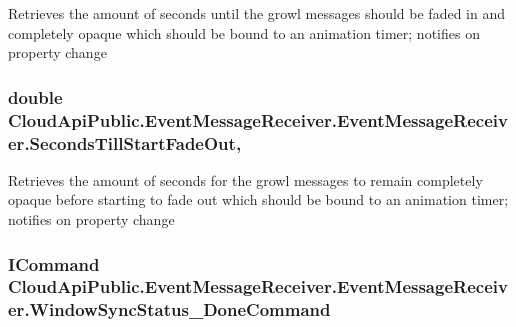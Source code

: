 Retrieves the amount of seconds until the growl messages should be faded in and completely opaque which should be bound to an animation timer; notifies on property change 

\hypertarget{class_cloud_api_public_1_1_event_message_receiver_1_1_event_message_receiver_a74a4bdd5d41cae17fa41ae47900697af}{
\subsubsection[{Seconds\-Till\-Start\-Fade\-Out}]{\setlength{\rightskip}{0pt plus 5cm}double Cloud\-Api\-Public.\-Event\-Message\-Receiver.\-Event\-Message\-Receiver.\-Seconds\-Till\-Start\-Fade\-Out\hspace{0.3cm}{\ttfamily [get]}, {\ttfamily [set]}}}\label{class_cloud_api_public_1_1_event_message_receiver_1_1_event_message_receiver_a74a4bdd5d41cae17fa41ae47900697af}


Retrieves the amount of seconds for the growl messages to remain completely opaque before starting to fade out which should be bound to an animation timer; notifies on property change 

\hypertarget{class_cloud_api_public_1_1_event_message_receiver_1_1_event_message_receiver_a464b93353f7142bb7290f357b059c511}{
\subsubsection[{Window\-Sync\-Status\-\_\-\-Done\-Command}]{\setlength{\rightskip}{0pt plus 5cm}I\-Command Cloud\-Api\-Public.\-Event\-Message\-Receiver.\-Event\-Message\-Receiver.\-Window\-Sync\-Status\-\_\-\-Done\-Command\hspace{0.3cm}{\ttfamily [get]}}}\label{class_cloud_api_public_1_1_event_message_receiver_1_1_event_message_receiver_a464b93353f7142bb7290f357b059c511}


